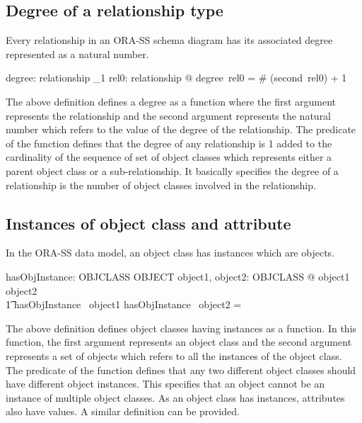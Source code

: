 \documentclass{entcs}
\begin{document}
\subsection{Degree of a relationship type}
Every relationship in an ORA-SS schema diagram has its associated
degree represented as a natural number.
\begin{small}
\begin{axdef}
  degree: relationship \fun \nat _1{}
\where
  \forall  rel0: relationship @ degree~rel0 = \# (second~rel0) + 1
\end{axdef}
\end{small}
The above definition defines a degree as a function where the
first argument represents the relationship and the second argument
represents the natural number which refers to the value of the
degree of the relationship. The predicate of the function defines
that the degree of any relationship is 1 added to the cardinality
of the sequence of set of object classes which represents either a
parent object class or a sub-relationship. It basically specifies
the degree of a relationship is the number of object classes
involved in the relationship.

\subsection{Instances of object class and attribute}
In the ORA-SS data model, an object class has instances which are
objects.
\begin{small}
\begin{axdef}
  hasObjInstance: OBJCLASS \fun  \power  OBJECT
\where
  \forall  object1, object2: OBJCLASS @ object1 \neq  object2 \\
  \t1 \implies  hasObjInstance~ object1 \cap  hasObjInstance~ object2 = \emptyset
\end{axdef}
\end{small}
The above definition defines object classes having instances as a
function. In this function, the first argument represents an
object class and the second argument represents a set of objects
which refers to all the instances of the object class. The
predicate of the function defines that any two different object
classes should have different object instances. This specifies
that an object cannot be an instance of multiple object classes.
As an object class has instances, attributes also have values. A
similar definition can be provided.
\end{document}
